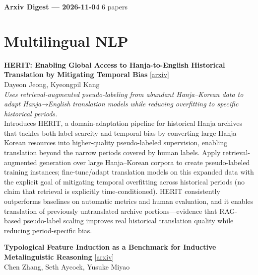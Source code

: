 \documentclass[12pt,letterpaper]{article}
\begin{document}
{\footnotesize\textbf{Arxiv Digest --- 2026-11-04} \hfill 6 papers}

\smallskip

\section*{Multilingual NLP}

{\small\textbf{HERIT: Enabling Global Access to Hanja-to-English Historical Translation by Mitigating Temporal Bias}} {\scriptsize[\href{https://arxiv.org/abs/2611.04949}{arxiv}]}\\
{\scriptsize Dayeon Jeong, Kyeongpil Kang}\\

{\small\textit{Uses retrieval-augmented pseudo-labeling from abundant Hanja--Korean data to adapt Hanja→English translation models while reducing overfitting to specific historical periods.}}\\[1pt]
{\footnotesize Introduces HERIT, a domain-adaptation pipeline for historical Hanja archives that tackles both label scarcity and temporal bias by converting large Hanja--Korean resources into higher-quality pseudo-labeled supervision, enabling translation beyond the narrow periods covered by human labels. Apply retrieval-augmented generation over large Hanja--Korean corpora to create pseudo-labeled training instances; fine-tune/adapt translation models on this expanded data with the explicit goal of mitigating temporal overfitting across historical periods (no claim that retrieval is explicitly time-conditioned). HERIT consistently outperforms baselines on automatic metrics and human evaluation, and it enables translation of previously untranslated archive portions---evidence that RAG-based pseudo-label scaling improves real historical translation quality while reducing period-specific bias.}

\medskip

{\small\textbf{Typological Feature Induction as a Benchmark for Inductive Metalinguistic Reasoning}} {\scriptsize[\href{https://arxiv.org/abs/2611.04421}{arxiv}]}\\
{\scriptsize Chen Zhang, Seth Aycock, Yusuke Miyao}\\
\end{document}
